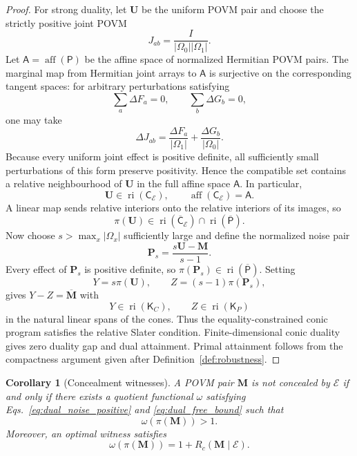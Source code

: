 \documentclass[
aps,pra,twocolumn,10pt,
superscriptaddress,longbibliography,floatfix
]{revtex4-2}
\newtheorem{corollary}[theorem]{Corollary}
\begin{document}
\begin{proof}
For strong duality, let $\mathbf U$ be the uniform POVM pair and choose the strictly positive joint POVM
\[
J_{ab}=\frac{I}{|\Omega_0||\Omega_1|}.
\]
Let $\mathsf A=\operatorname{aff}(\mathsf P)$ be the affine space of normalized Hermitian POVM pairs. The marginal map from Hermitian joint arrays to $\mathsf A$ is surjective on the corresponding tangent spaces: for arbitrary perturbations satisfying
\[
\sum_a\Delta F_a=0,
\qquad
\sum_b\Delta G_b=0,
\]
one may take
\[
\Delta J_{ab}
=
\frac{\Delta F_a}{|\Omega_1|}
+
\frac{\Delta G_b}{|\Omega_0|}.
\]
Because every uniform joint effect is positive definite, all sufficiently small perturbations of this form preserve positivity. Hence the compatible set contains a relative neighbourhood of $\mathbf U$ in the full affine space $\mathsf A$. In particular,
\[
\mathbf U\in\operatorname{ri}(\mathsf C_{\mathcal E}),
\qquad
\operatorname{aff}(\mathsf C_{\mathcal E})=\mathsf A.
\]
A linear map sends relative interiors onto the relative interiors of its images, so
\[
\pi(\mathbf U)
\in
\operatorname{ri}(\overline{\mathsf C}_{\mathcal E})
\cap
\operatorname{ri}(\overline{\mathsf P}).
\]
Now choose $s>\max_x|\Omega_x|$ sufficiently large and define the normalized noise pair
\[
\mathbf P_s
=
\frac{s\mathbf U-\mathbf M}{s-1}.
\]
Every effect of $\mathbf P_s$ is positive definite, so $\pi(\mathbf P_s)\in\operatorname{ri}(\overline{\mathsf P})$. Setting
\[
Y=s\pi(\mathbf U),
\qquad
Z=(s-1)\pi(\mathbf P_s),
\]
gives $Y-Z=\overline{\mathbf M}$ with
\[
Y\in\operatorname{ri}(\mathsf K_C),
\qquad
Z\in\operatorname{ri}(\mathsf K_P)
\]
in the natural linear spans of the cones. Thus the equality-constrained conic program satisfies the relative Slater condition. Finite-dimensional conic duality \cite{BoydVandenberghe2004} gives zero duality gap and dual attainment. Primal attainment follows from the compactness argument given after Definition~\ref{def:robustness}.
\end{proof}

\begin{corollary}[Concealment witnesses]
\label{cor:concealment_witness}
A POVM pair $\mathbf M$ is not concealed by $\mathcal E$ if and only if there exists a quotient functional $\omega$ satisfying Eqs.~\eqref{eq:dual_noise_positive} and \eqref{eq:dual_free_bound} such that
\[
\omega(\pi(\mathbf M))>1.
\]
Moreover, an optimal witness satisfies
\[
\omega(\pi(\mathbf M))
=
1+R_c(\mathbf M\mid\mathcal E).
\]
\end{corollary}
\end{document}
